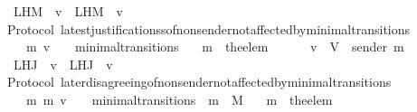 \begin{isabellebody}
\ \ {\isasymlongrightarrow}\ L{\isacharunderscore}H{\isacharunderscore}M\ {\isasymsigma}\ v\ {\isacharequal}\ L{\isacharunderscore}H{\isacharunderscore}M\ {\isasymsigma}{\isacharprime}\ v{\isachardoublequoteclose}\isanewline
%
\isadelimproof
\ \ %
\endisadelimproof
%
\isatagproof
{}\isamarkupfalse%
%
\endisatagproof
{\isafoldproof}%
%
\isadelimproof
\isanewline
%
\endisadelimproof
\isanewline
\isanewline
{}\isamarkupfalse%
\ {\isacharparenleft}\ Protocol{\isacharparenright}\ latest{\isacharunderscore}justificationss{\isacharunderscore}of{\isacharunderscore}non{\isacharunderscore}sender{\isacharunderscore}not{\isacharunderscore}affected{\isacharunderscore}by{\isacharunderscore}minimal{\isacharunderscore}transitions\ {\isacharcolon}\isanewline
\ \ {\isachardoublequoteopen}{\isasymforall}\ {\isasymsigma}\ {\isasymsigma}{\isacharprime}\ m{\isacharprime}\ v{\isachardot}\ {\isacharparenleft}{\isasymsigma}{\isacharcomma}\ {\isasymsigma}{\isacharprime}{\isacharparenright}\ {\isasymin}\ minimal{\isacharunderscore}transitions\isanewline
\ \ {\isasymlongrightarrow}\ m{\isacharprime}\ {\isacharequal}\ the{\isacharunderscore}elem\ {\isacharparenleft}{\isasymsigma}{\isacharprime}\ {\isacharminus}\ {\isasymsigma}{\isacharparenright}\isanewline
\ \ {\isasymlongrightarrow}\ v\ {\isasymin}\ V\ {\isacharminus}\ {\isacharbraceleft}sender\ m{\isacharprime}{\isacharbraceright}\isanewline
\ \ {\isasymlongrightarrow}\ L{\isacharunderscore}H{\isacharunderscore}J\ {\isasymsigma}\ v\ {\isacharequal}\ L{\isacharunderscore}H{\isacharunderscore}J\ {\isasymsigma}{\isacharprime}\ v{\isachardoublequoteclose}\isanewline
%
\isadelimproof
\ \ %
\endisadelimproof
%
\isatagproof
{}\isamarkupfalse%
%
\endisatagproof
{\isafoldproof}%
%
\isadelimproof
\isanewline
%
\endisadelimproof
\isanewline
\isanewline
{}\isamarkupfalse%
\ {\isacharparenleft}\ Protocol{\isacharparenright}\ later{\isacharunderscore}disagreeing{\isacharunderscore}of{\isacharunderscore}non{\isacharunderscore}sender{\isacharunderscore}not{\isacharunderscore}affected{\isacharunderscore}by{\isacharunderscore}minimal{\isacharunderscore}transitions\ {\isacharcolon}\isanewline
\ \ {\isachardoublequoteopen}{\isasymforall}\ {\isasymsigma}\ {\isasymsigma}{\isacharprime}\ m\ m{\isacharprime}\ v{\isachardot}\ {\isacharparenleft}{\isasymsigma}{\isacharcomma}\ {\isasymsigma}{\isacharprime}{\isacharparenright}\ {\isasymin}\ minimal{\isacharunderscore}transitions\ {\isasymand}\ m\ {\isasymin}\ M\isanewline
\ \ {\isasymlongrightarrow}\ m{\isacharprime}\ {\isacharequal}\ the{\isacharunderscore}elem\ {\isacharparenleft}{\isasymsigma}{\isacharprime}\ {\isacharminus}\ {\isasymsigma}{\isacharparenright}\isanewline

\end{isabellebody}
